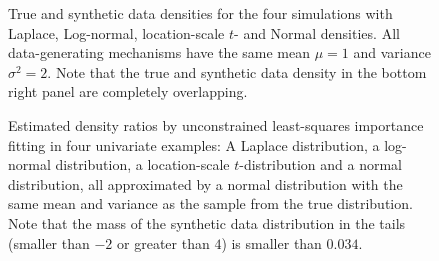 \documentclass[
]{article}
\begin{document}
\begin{figure}[t]


\caption{\label{fig-densities-sim1}True and synthetic data densities for
the four simulations with Laplace, Log-normal, location-scale \(t\)- and
Normal densities. All data-generating mechanisms have the same mean
\(\mu = 1\) and variance \(\sigma^2 = 2\). Note that the true and
synthetic data density in the bottom right panel are completely
overlapping.}

\end{figure}%

\linespread{2}

\linespread{1}

\begin{figure}[t]


\caption{\label{fig-sim1-results}Estimated density ratios by
unconstrained least-squares importance fitting in four univariate
examples: A Laplace distribution, a log-normal distribution, a
location-scale \(t\)-distribution and a normal distribution, all
approximated by a normal distribution with the same mean and variance as
the sample from the true distribution. Note that the mass of the
synthetic data distribution in the tails (smaller than \(-2\) or greater
than \(4\)) is smaller than \(0.034\).}

\end{figure}%
\end{document}
